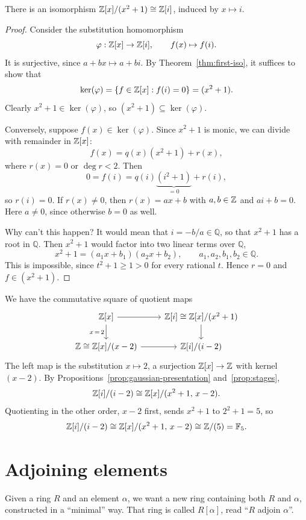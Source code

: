 \documentclass[reqno,11pt]{amsart}
\newcommand{\Q}{\mathbb{Q}}
\newcommand{\F}{\mathbb{F}}
\begin{document}
\begin{proposition}\label{prop:gaussian-presentation}
There is an isomorphism $\mathbb{Z}[x]/(x^2+1)\cong\mathbb{Z}[i]$, induced by
$x\mapsto i$.
\end{proposition}
\begin{proof}
Consider the substitution homomorphism
\[
  \varphi:\mathbb{Z}[x]\to\mathbb{Z}[i],\qquad f(x)\mapsto f(i).
\]
It is surjective, since $a+bx\mapsto a+bi$. By
Theorem~\ref{thm:first-iso}, it suffices to show that
\[
  \ker(\varphi)=\{f\in\mathbb{Z}[x]:f(i)=0\}=(x^2+1).
\]
Clearly $x^2+1\in\ker(\varphi)$, so $(x^2+1)\subseteq\ker(\varphi)$.

Conversely, suppose $f(x)\in\ker(\varphi)$. Since $x^2+1$ is monic,
we can divide with remainder in $\mathbb{Z}[x]$:
\[
  f(x)=q(x)(x^2+1)+r(x),
\]
where $r(x)=0$ or $\deg r<2$. Then
\[
  0=f(i)=q(i)\underbrace{(i^2+1)}_{=0}+r(i),
\]
so $r(i)=0$. If $r(x)\neq0$, then $r(x)=ax+b$ with $a,b\in\mathbb{Z}$ and
$ai+b=0$. Here $a\neq0$, since otherwise $b=0$ as well.

Why can't this happen? It would mean that $i=-b/a\in\Q$, so that
$x^2+1$ has a root in $\Q$. Then $x^2+1$ would factor into two linear
terms over $\Q$,
\[
  x^2+1=(a_1x+b_1)(a_2x+b_2),\qquad a_1,a_2,b_1,b_2\in\Q.
\]
This is impossible, since $t^2+1\geq1>0$ for every rational $t$.
Hence $r=0$ and $f\in(x^2+1)$.
\end{proof}

\begin{example}
We have the commutative square of quotient maps
\[
  \begin{tikzcd}
    \Z[x] \arrow[r] \arrow[d,"x\,=\,2"'] &
      \Z[i]\cong\Z[x]/(x^2+1) \arrow[d]\\
    \Z\cong\Z[x]/(x-2) \arrow[r] & \Z[i]/(i-2)
  \end{tikzcd}
\]
The left map is the substitution $x\mapsto2$, a surjection
$\mathbb{Z}[x]\to\mathbb{Z}$ with kernel $(x-2)$. By
Propositions~\ref{prop:gaussian-presentation} and~\ref{prop:stages},
\[
  \mathbb{Z}[i]/(i-2)\cong\mathbb{Z}[x]/(x^2+1,\,x-2).
\]
Quotienting in the other order, $x-2$ first, sends $x^2+1$ to
$2^2+1=5$, so
\[
  \Z[i]/(i-2)\cong\Z[x]/(x^2+1,\,x-2)\cong\Z/(5)=\F_5.
\]
\end{example}

\section{Adjoining elements}

Given a ring $R$ and an element $\alpha$, we want a new ring
containing both $R$ and $\alpha$, constructed in a ``minimal'' way.
That ring is called $R[\alpha]$, read ``$R$ adjoin $\alpha$''.
\end{document}
